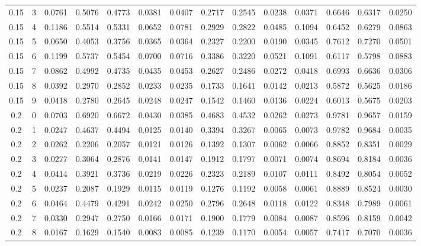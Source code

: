\documentclass[10pt, conference, a4paper, final]{IEEEtran}
\begin{document}
\begin{table}[ht]
{\begin{tabular}{cccccccccccccc}
        0.15 & 3 & 0.0761 & 0.5076 & 0.4773 & 0.0381 & 0.0407 & 0.2717 & 0.2545 & 0.0238 & 0.0371 & 0.6646 & 0.6317 & 0.0250 \\
        0.15 & 4 & 0.1186 & 0.5514 & 0.5331 & 0.0652 & 0.0781 & 0.2929 & 0.2822 & 0.0485 & 0.1094 & 0.6452 & 0.6279 & 0.0863 \\
        0.15 & 5 & 0.0650 & 0.4053 & 0.3756 & 0.0365 & 0.0364 & 0.2327 & 0.2200 & 0.0190 & 0.0345 & 0.7612 & 0.7270 & 0.0501 \\
        0.15 & 6 & 0.1199 & 0.5737 & 0.5454 & 0.0700 & 0.0716 & 0.3386 & 0.3220 & 0.0521 & 0.1091 & 0.6117 & 0.5798 & 0.0883 \\
        0.15 & 7 & 0.0862 & 0.4992 & 0.4735 & 0.0435 & 0.0453 & 0.2627 & 0.2486 & 0.0272 & 0.0418 & 0.6993 & 0.6636 & 0.0306 \\
        0.15 & 8 & 0.0392 & 0.2970 & 0.2852 & 0.0233 & 0.0235 & 0.1733 & 0.1641 & 0.0142 & 0.0213 & 0.5872 & 0.5625 & 0.0186 \\
        0.15 & 9 & 0.0418 & 0.2780 & 0.2645 & 0.0248 & 0.0247 & 0.1542 & 0.1460 & 0.0136 & 0.0224 & 0.6013 & 0.5675 & 0.0203 \\
        0.2 & 0 & 0.0703 & 0.6920 & 0.6672 & 0.0430 & 0.0385 & 0.4683 & 0.4532 & 0.0262 & 0.0273 & 0.9781 & 0.9657 & 0.0159 \\
        0.2 & 1 & 0.0247 & 0.4637 & 0.4494 & 0.0125 & 0.0140 & 0.3394 & 0.3267 & 0.0065 & 0.0073 & 0.9782 & 0.9684 & 0.0035 \\
        0.2 & 2 & 0.0262 & 0.2206 & 0.2057 & 0.0121 & 0.0126 & 0.1392 & 0.1307 & 0.0062 & 0.0066 & 0.8852 & 0.8351 & 0.0029 \\
        0.2 & 3 & 0.0277 & 0.3064 & 0.2876 & 0.0141 & 0.0147 & 0.1912 & 0.1797 & 0.0071 & 0.0074 & 0.8694 & 0.8184 & 0.0036 \\
        0.2 & 4 & 0.0414 & 0.3921 & 0.3736 & 0.0219 & 0.0226 & 0.2323 & 0.2189 & 0.0107 & 0.0111 & 0.8492 & 0.8054 & 0.0052 \\
        0.2 & 5 & 0.0237 & 0.2087 & 0.1929 & 0.0115 & 0.0119 & 0.1276 & 0.1192 & 0.0058 & 0.0061 & 0.8889 & 0.8524 & 0.0030 \\
        0.2 & 6 & 0.0464 & 0.4479 & 0.4291 & 0.0242 & 0.0250 & 0.2796 & 0.2648 & 0.0118 & 0.0122 & 0.8348 & 0.7989 & 0.0061 \\
        0.2 & 7 & 0.0330 & 0.2947 & 0.2750 & 0.0166 & 0.0171 & 0.1900 & 0.1779 & 0.0084 & 0.0087 & 0.8596 & 0.8159 & 0.0042 \\
        0.2 & 8 & 0.0167 & 0.1629 & 0.1540 & 0.0083 & 0.0085 & 0.1239 & 0.1170 & 0.0054 & 0.0057 & 0.7417 & 0.7070 & 0.0036 \\

\end{tabular}}
\end{table}
\end{document}
